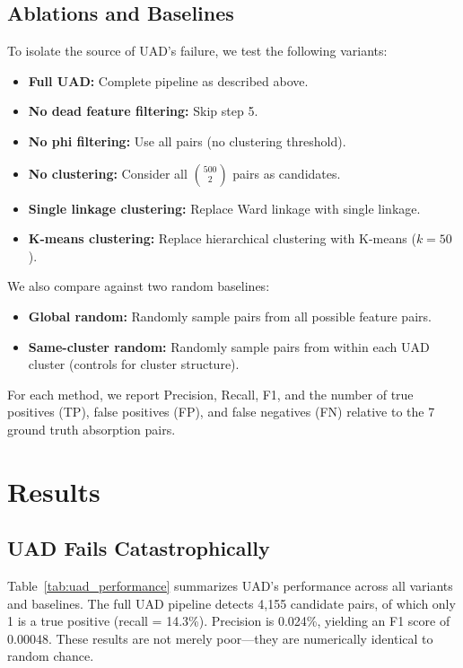 \documentclass{article}
\begin{document}
\subsection{Ablations and Baselines}

To isolate the source of UAD's failure, we test the following variants:
\begin{itemize}
\item \textbf{Full UAD:} Complete pipeline as described above.
\item \textbf{No dead feature filtering:} Skip step 5.
\item \textbf{No phi filtering:} Use all pairs (no clustering threshold).
\item \textbf{No clustering:} Consider all $\binom{500}{2}$ pairs as candidates.
\item \textbf{Single linkage clustering:} Replace Ward linkage with single linkage.
\item \textbf{K-means clustering:} Replace hierarchical clustering with K-means ($k = 50$).
\end{itemize}

We also compare against two random baselines:
\begin{itemize}
\item \textbf{Global random:} Randomly sample pairs from all possible feature pairs.
\item \textbf{Same-cluster random:} Randomly sample pairs from within each UAD cluster (controls for cluster structure).
\end{itemize}

For each method, we report Precision, Recall, F1, and the number of true positives (TP), false positives (FP), and false negatives (FN) relative to the 7 ground truth absorption pairs.

\section{Results}
\label{sec:results}

\subsection{UAD Fails Catastrophically}

Table~\ref{tab:uad_performance} summarizes UAD's performance across all variants and baselines. The full UAD pipeline detects 4,155 candidate pairs, of which only 1 is a true positive (recall = 14.3\%). Precision is 0.024\%, yielding an F1 score of 0.00048. These results are not merely poor---they are numerically identical to random chance.
\end{document}

